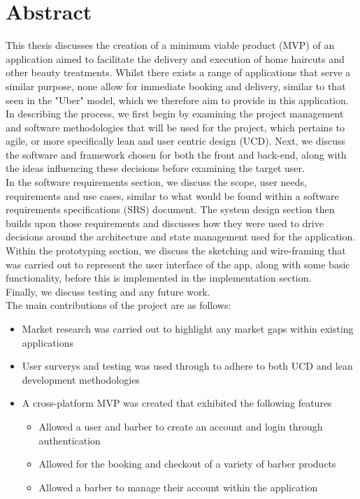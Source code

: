\documentclass[12pt]{article}
\begin{document}
	\section*{Abstract}
	This thesis discusses the creation of a minimum viable product (MVP) of an application aimed to facilitate the delivery and execution of home haircuts and other beauty treatments. Whilst there exists a range of applications that serve a similar purpose, none allow for immediate booking and delivery, similar to that seen in the "Uber" model, which we therefore aim to provide in this application.
	\\
	In describing the process, we first begin by examining the project management and software methodologies that will be used for the project, which pertains to agile, or more specifically lean and user centric design (UCD). Next, we discuss the software and framework chosen for both the front and back-end, along with the ideas influencing these decisions before examining the target user.
	\\
	In the software requirements section, we discuss the scope, user needs, requirements and use cases, similar to what would be found within a software requirements specifications (SRS) document. The system design section then builds upon those requirements and discusses how they were used to drive decisions around the architecture and state management used for the application.
	\\
	Within the prototyping section, we discuss the sketching and wire-framing that was carried out to represent the user interface of the app, along with some basic functionality, before this is implemented in the implementation section.
	\\
	Finally, we discuss testing and any future work.
	\\
	
	The main contributions of the project are as follows:
	\begin{itemize}
		\item Market research was carried out to highlight any market gaps within existing applications
		\item User surverys and testing was used through to adhere to both UCD and lean development methodologies
		\item A cross-platform MVP was created that exhibited the following features
		\begin{itemize}
			\item Allowed a user and barber to create an account and login through authentication
			\item Allowed for the booking and checkout of a variety of barber products
			\item Allowed a barber to manage their account within the application
		\end{itemize}
	\end{itemize}
	
\end{document}
